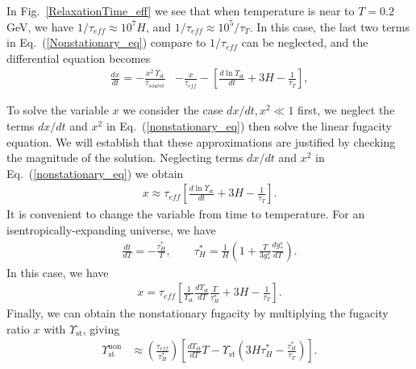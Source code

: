 In Fig.~\ref{RelaxationTime_eff} we see that when temperature is near to $T=0.2$ GeV, we have $1/\tau_{eff}\approx10^{7}H$, and $1/\tau_{eff}\approx10^5/\tau_T$. In this case, the last two terms in Eq.~(\ref{Nonstationary_eq}) compare to $1/\tau_{eff}$ can be neglected, and the differential equation becomes
\begin{align}\label{nonstationary_eq}
\frac{dx}{dt}=-\frac{x^2\,\Upsilon_\mathrm{st}}{\tau_{source}}&-\frac{x}{\tau_{eff}}-\left[\frac{d\ln\Upsilon_\mathrm{st}}{dt}+3H-\frac{1}{\tau_T}\right],
\end{align}


To solve the variable $x$ we consider the case $dx/dt,x^2\ll1$ first, we neglect the terms $dx/dt$ and $x^2$ in Eq.~(\ref{nonstationary_eq})  then solve the linear fugacity equation.  We will establish that these approximations are justified by checking the magnitude of the solution. Neglecting terms $dx/dt$ and $x^2$ in Eq.~(\ref{nonstationary_eq}) we obtain
\begin{align}
x\approx\tau_{eff}\left[\frac{d\ln\Upsilon_\mathrm{st}}{dt}+3H-\frac{1}{\tau_T}\right].
\end{align}
It is convenient to change the variable from time to temperature. For an isentropically-expanding universe, we have
\begin{align}\label{tau_H}
\frac{dt}{dT}=-\frac{\tau^\ast_H}{T},\qquad \tau^\ast_H=\frac{1}{H}\left(1+\frac{T}{3g^s_\ast}\frac{dg^s_\ast}{dT}\right).
\end{align}
In this case, we have
\begin{align}
x=\tau_{eff}\left[\frac{1}{\Upsilon_\mathrm{st}}\frac{d\Upsilon_\mathrm{st}}{dT}\frac{T}{\tau^\ast_H}+3H-\frac{1}{\tau_T}\right].
\end{align}
Finally, we can obtain the nonstationary fugacity by multiplying the fugacity ratio $x$ with $\Upsilon_\mathrm{st}$, giving 
\begin{align}
\Upsilon_{\mathrm{st}}^{\mathrm{non}}
&\approx\left(\frac{\tau_{eff}}{\tau^\ast_H}\right)\left[\frac{d\Upsilon_\mathrm{st}}{dT}T-\Upsilon_{\mathrm{st}}\left(3H\tau^\ast_H-\frac{\tau^\ast_H}{\tau_T}\right)\right].
\end{align}

